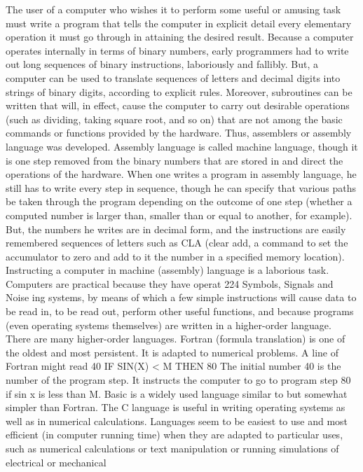 {{{{{{{{{{{The user of a computer who wishes it to perform some useful or
amusing task must write a program that tells the computer in explicit
detail every elementary operation it must go through in
attaining the desired result. Because a computer operates internally
in terms of binary numbers, early programmers had to write out
long sequences of binary instructions, laboriously and fallibly.
But, a computer can be used to translate sequences of letters and
decimal digits into strings of binary digits, according to explicit
rules. Moreover, subroutines can be written that will, in effect, cause
the computer to carry out desirable operations (such as dividing,
taking square root, and so on) that are not among the basic commands
or functions provided by the hardware. Thus, assemblers
or assembly language was developed. Assembly language is called
machine language, though it is one step removed from the binary
numbers that are stored in and direct the operations of the
hardware.
When one writes a program in assembly language, he still has to
write every step in sequence, though he can specify that various
paths be taken through the program depending on the outcome of
one step (whether a computed number is larger than, smaller than
or equal to another, for example). But, the numbers he writes are
in decimal form, and the instructions are easily remembered sequences
of letters such as CLA (clear add, a command to set the
accumulator to zero and add to it the number in a specified memory
location).
Instructing a computer in machine (assembly) language is a
laborious task. Computers are practical because they have operat
224
Symbols, Signals and Noise
ing systems, by means of which a few simple instructions will cause
data to be read in, to be read out, perform other useful functions,
and because programs (even operating systems themselves) are
written in a higher-order language.
There are many higher-order languages. Fortran (formula translation)
is one of the oldest and most persistent. It is adapted to
numerical problems. A line of Fortran might read
40 IF SIN(X) < M THEN 80
The initial number 40 is the number of the program step. It
instructs the computer to go to program step 80 if sin x is less
than M.
Basic is a widely used language similar to but somewhat simpler
than Fortran. The C language is useful in writing operating systems
as well as in numerical calculations. Languages seem to be easiest
to use and most efficient (in computer running time) when they
are adapted to particular uses, such as numerical calculations or
text manipulation or running simulations of electrical or mechanical
}}}}}}}}}}}
